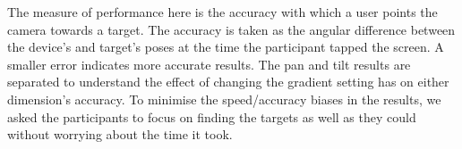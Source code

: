\documentclass[sigconf, screen=true, anonymous=true]{acmart}
\begin{document}

The measure of performance here is the accuracy with which a user points the camera towards a target.
The accuracy is taken as the angular difference between the device's and target's poses at the time the participant tapped the screen.
A smaller error indicates more accurate results.
The pan and tilt results are separated to understand the effect of changing the gradient setting has on either dimension's accuracy.
To minimise the speed/accuracy biases in the results, we asked the participants to focus on finding the targets as well as they could without worrying about the time it took.  



\end{document}
